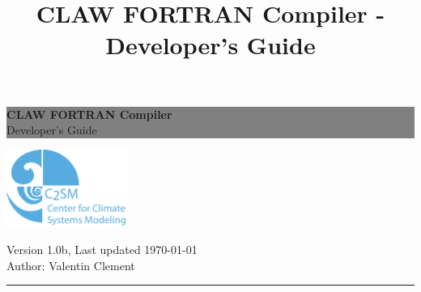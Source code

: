 \documentclass[a4paper, 11pt]{report}
\author{\authorname{}}
\title{CLAW FORTRAN Compiler - Developer's Guide}
\newcommand{\authorname}{Valentin Clement}
\newcommand{\version}{1.0b}
\newcommand{\HRule}{\rule{\linewidth}{0.5mm}}
\newcommand{\emptypage}{}
\begin{document}
\thispagestyle{empty} %

\colorbox{grey}{
	\parbox[t]{1.0\linewidth}{
		\centering \fontsize{35pt}{80pt}\selectfont

		\vspace*{2cm}

		\hfill \textbf{CLAW FORTRAN Compiler} \\
		\hfill Developer's Guide\par

		\vspace*{2cm}
	}
}

\vfill

\begin{center}
\includegraphics[width=4cm]{resources/c2sm_logo.pdf} \\
\end{center}

\vfill %

\begin{center}
Version \version{}, Last updated \today \\
Author: \authorname{}
\end{center}
\HRule

\clearpage %




%

\end{document}
